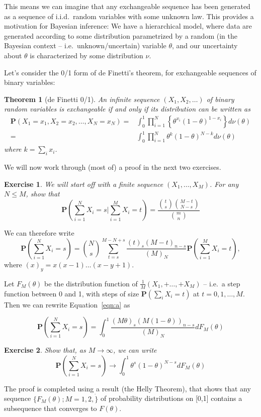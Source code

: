 \documentclass[twoside]{article}
\newcounter{lecnum}
\newtheorem{theorem}{Theorem}[lecnum]
\newtheorem{exercise}{Exercise}[lecnum]
\newcommand\Prob{\mathbf{P}}
\begin{document}
This means we can imagine that any exchangeable sequence has been generated as a sequence of i.i.d.\ random variables with some unknown law. This provides a motivation for Bayesian inference: We have a hierarchical model, where data are generated according to some distribution parametrized by a random (in the Bayesian context -- i.e.\ unknown/uncertain) variable $\theta$, and our uncertainty about $\theta$ is characterized by some distribution $\nu$.

Let's consider the 0/1 form of de Finetti's theorem, for exchangeable sequences of binary variables:


\begin{theorem}[de Finetti 0/1]
  An infinite sequence $(X_1,X_2,\dots)$ of binary random variables is exchangeable if and only if its distribution can be written as
  $$\begin{aligned}\Prob(X_1=x_1,X_2=x_2,\dots, X_N=x_N)  =& \int_0^1\prod_{i=1}^N\left\{\theta^{x_i}(1-\theta)^{1-x_i}\right\} d\nu(\theta)\\
    =&\int_0^1\prod_{i=1}^N\theta^{k}(1-\theta)^{N-k} d\nu(\theta)\end{aligned}$$
  where $k=\sum_ix_i$.
\end{theorem}

We will now work through (most of) a proof in the next two exercises.

\begin{exercise}
  We will start off with a finite sequence $(X_1,\dots, X_M)$. For any $N\leq M$, show that
  $$\Prob\left(\sum_{i=1}^N X_i = s\Big|\sum_{i=1}^M X_i = t\right) = \frac{{t\choose s}{M-t\choose N-s}}{{m \choose n}}$$
\end{exercise}
We can therefore write
\begin{equation}\Prob\left(\sum_{i=1}^N X_i = s\right) = {N\choose s}\sum_{t=s}^{M-N+s}\frac{(t)_s(M-t)_{n-s}}{(M)_N}\Prob\left(\sum_{i=1}^M X_i = t\right),\label{eqn:a}\end{equation}
where $(x)_y = x(x-1)\dots (x-y+1)$.

Let $F_M(\theta)$ be the distribution function of $\frac{1}{M}(X_1, + \dots, + X_M)$  --  i.e.\ a step function between 0 and 1, with steps of size $\Prob(\sum_i X_i= t)$ at $t=0,1,\dots, M$. Then we can rewrite Equation~\ref{eqn:a} as

$$\Prob\left(\sum_{i=1}^N X_i = s\right) = \int_0^1\frac{(M\theta)_s(M(1-\theta))_{n-s}}{(M)_N}dF_M(\theta)$$
\begin{exercise}
  Show that, as $M\rightarrow \infty$, we can write
  $$\Prob\left(\sum_{i=1}^N X_i = s\right) \rightarrow \int_0^1\theta^s(1-\theta)^{N-s}dF_M(\theta)$$
\end{exercise}
The proof is completed using a result (the Helly Theorem), that shows that any sequence $\{F_M(\theta); M=1,2,\dot\}$ of probability distributions on [0,1] contains a subsequence that converges to $F(\theta)$.
\end{document}
